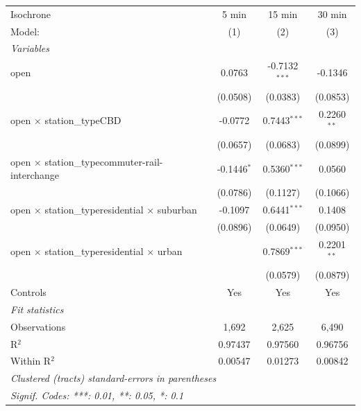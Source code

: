 
\begingroup
\centering
\begin{tabular}{lccc}
   \tabularnewline \midrule \midrule
   Isochrone                                                   & 5 min         & 15 min          & 30 min \\   
   Model:                                                      & (1)           & (2)             & (3)\\  
   \midrule
   \emph{Variables}\\
   open                                                        & 0.0763        & -0.7132$^{***}$ & -0.1346\\   
                                                               & (0.0508)      & (0.0383)        & (0.0853)\\   
   open $\times$ station\_typeCBD                              & -0.0772       & 0.7443$^{***}$  & 0.2260$^{**}$\\   
                                                               & (0.0657)      & (0.0683)        & (0.0899)\\   
   open $\times$ station\_typecommuter-rail-interchange        & -0.1446$^{*}$ & 0.5360$^{***}$  & 0.0560\\   
                                                               & (0.0786)      & (0.1127)        & (0.1066)\\   
   open $\times$ station\_typeresidential $\times$ suburban    & -0.1097       & 0.6441$^{***}$  & 0.1408\\   
                                                               & (0.0896)      & (0.0649)        & (0.0950)\\   
   open $\times$ station\_typeresidential $\times$ urban       &               & 0.7869$^{***}$  & 0.2201$^{**}$\\   
                                                               &               & (0.0579)        & (0.0879)\\   
   Controls                                                    & Yes           & Yes             & Yes\\  
   \midrule
   \emph{Fit statistics}\\
   Observations                                                & 1,692         & 2,625           & 6,490\\  
   R$^2$                                                       & 0.97437       & 0.97560         & 0.96756\\  
   Within R$^2$                                                & 0.00547       & 0.01273         & 0.00842\\  
   \midrule \midrule
   \multicolumn{4}{l}{\emph{Clustered (tracts) standard-errors in parentheses}}\\
   \multicolumn{4}{l}{\emph{Signif. Codes: ***: 0.01, **: 0.05, *: 0.1}}\\
\end{tabular}
\par\endgroup


